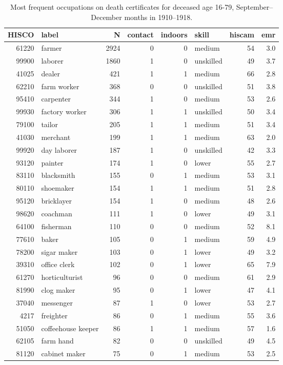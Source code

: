 \begin{table}[h!]
\centering
\begin{tabular}{rlrrrlrr}
  \hline
HISCO & label & N & contact & indoors & skill & hiscam & emr \\ 
  \hline
61220 & farmer & 2924 &  0 &  0 & medium & 54 & 3.0 \\ 
  99900 & laborer & 1860 &  1 &  0 & unskilled & 49 & 3.7 \\ 
  41025 & dealer & 421 &  1 &  1 & medium & 66 & 2.8 \\ 
  62210 & farm worker & 368 &  0 &  0 & unskilled & 51 & 3.8 \\ 
  95410 & carpenter & 344 &  1 &  0 & medium & 53 & 2.6 \\ 
  99930 & factory worker & 306 &  1 &  1 & unskilled & 50 & 3.4 \\ 
  79100 & tailor & 205 &  1 &  1 & medium & 51 & 3.4 \\ 
  41030 & merchant & 199 &  1 &  1 & medium & 63 & 2.0 \\ 
  99920 & day laborer & 187 &  1 &  0 & unskilled & 42 & 3.3 \\ 
  93120 & painter & 174 &  1 &  0 & lower & 55 & 2.7 \\ 
  83110 & blacksmith & 155 &  0 &  1 & medium & 53 & 3.1 \\ 
  80110 & shoemaker & 154 &  1 &  1 & medium & 51 & 2.8 \\ 
  95120 & bricklayer & 154 &  1 &  0 & medium & 48 & 2.6 \\ 
  98620 & coachman & 111 &  1 &  0 & lower & 49 & 3.1 \\ 
  64100 & fisherman & 110 &  0 &  0 & medium & 52 & 8.1 \\ 
  77610 & baker & 105 &  0 &  1 & medium & 59 & 4.9 \\ 
  78200 & sigar maker & 103 &  0 &  1 & lower & 49 & 3.2 \\ 
  39310 & office clerk & 102 &  0 &  1 & lower & 65 & 7.9 \\ 
  61270 & horticulturist & 96 &  0 &  0 & medium & 61 & 2.9 \\ 
  81990 & clog maker & 95 &  0 &  1 & lower & 47 & 4.1 \\ 
  37040 & messenger & 87 &  1 &  0 & lower & 53 & 2.7 \\ 
  4217 & freighter & 86 &  0 &  1 & medium & 55 & 3.6 \\ 
  51050 & coffeehouse keeper & 86 &  1 &  1 & medium & 57 & 1.6 \\ 
  62105 & farm hand & 82 &  0 &  0 & unskilled & 49 & 4.5 \\ 
  81120 & cabinet maker & 75 &  0 &  1 & medium & 53 & 2.5 \\ 
   \hline
\end{tabular}
\caption{Most frequent occupations on death certificates for deceased age 16-79, September--December months in 1910--1918.} 
\label{tab:topoccs_selected}
\end{table}

